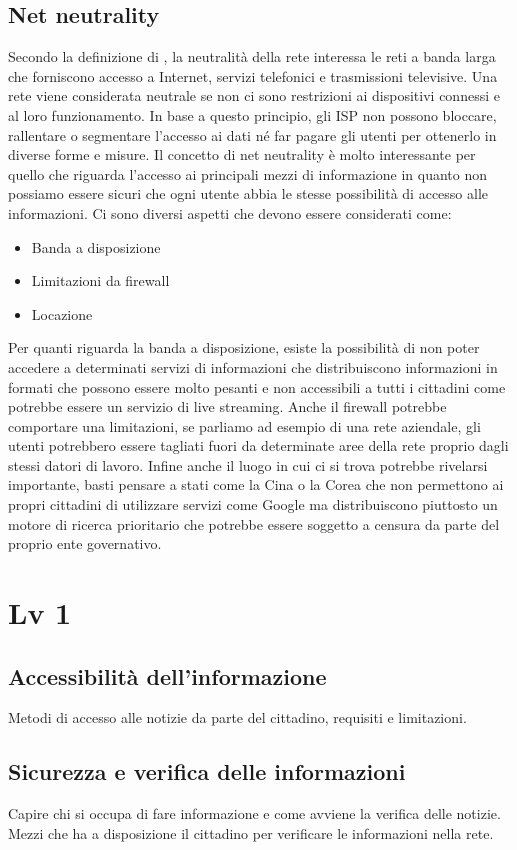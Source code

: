 \documentclass{article}
\begin{document}
\subsection{Net neutrality}
Secondo la definizione di \cite{crowcroft2007net}, la neutralità della rete interessa le reti a banda larga che forniscono accesso a Internet, servizi telefonici e trasmissioni televisive. Una rete viene considerata neutrale se non ci sono restrizioni ai dispositivi connessi e al loro funzionamento. In base a questo principio, gli ISP non possono bloccare, rallentare o segmentare l’accesso ai dati né far pagare gli utenti per ottenerlo in diverse forme e misure.
Il concetto di net neutrality è molto interessante per quello che riguarda l'accesso ai principali mezzi di informazione in quanto non possiamo essere sicuri che ogni utente abbia le stesse possibilità di accesso alle informazioni.
Ci sono diversi aspetti che devono essere considerati come:
\begin{itemize}
    \item Banda a disposizione
    \item Limitazioni da firewall
    \item Locazione
\end{itemize}
Per quanti riguarda la banda a disposizione, esiste la possibilità di non poter accedere a determinati servizi di informazioni che distribuiscono informazioni in formati che possono essere molto pesanti e non accessibili a tutti i cittadini come potrebbe essere un servizio di live streaming.
Anche il firewall potrebbe comportare una limitazioni, se parliamo ad esempio di una rete aziendale, gli utenti potrebbero essere tagliati fuori da determinate aree della rete proprio dagli stessi datori di lavoro.
Infine anche il luogo in cui ci si trova potrebbe rivelarsi importante, basti pensare a stati come la Cina o la Corea che non permettono ai propri cittadini di utilizzare servizi come Google ma distribuiscono piuttosto un motore di ricerca prioritario che potrebbe essere soggetto a censura da parte del proprio ente governativo.
\section{Lv 1}
\subsection{Accessibilità dell'informazione}
Metodi di accesso alle notizie da parte del cittadino, requisiti e limitazioni.
\subsection{Sicurezza e verifica delle informazioni}
Capire chi si occupa di fare informazione e come avviene la verifica delle notizie.
Mezzi che ha a disposizione il cittadino per verificare le informazioni nella rete.
\end{document}
